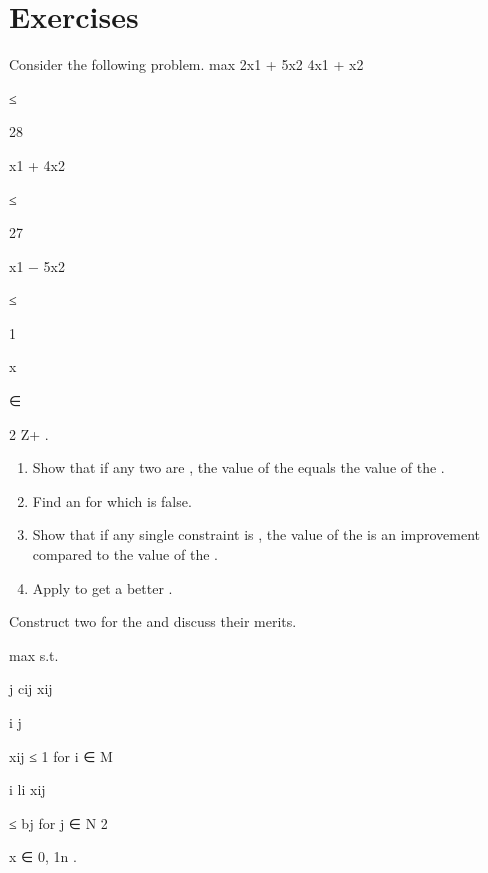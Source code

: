 \section*{Exercises}
\begin{exercise}
Consider the following problem.
max 2x1 + 5x2
4x1 + x2

≤

28

x1 + 4x2

≤

27

x1 − 5x2

≤

1

x

∈

2
Z+
.

\begin{enumerate}
 \item {} Show that if any two  are , the value of the  equals the value of the .
 \item Find an  for which  is false.
 \item Show that if any single constraint is , the value of the  is an improvement compared to the value of the .
 \item Apply  to get a better .
\end{enumerate}
\end{exercise}

\begin{exercise}
Construct two  for the  and discuss their merits.

max
s.t.

j cij xij

i
j

xij ≤ 1 for i ∈ M

i li xij

≤ bj for j ∈ N
2

x ∈ {0, 1}n .
\end{exercise}